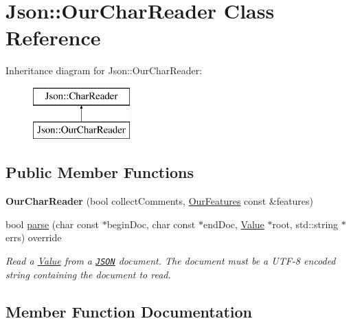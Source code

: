 \hypertarget{class_json_1_1_our_char_reader}{}\section{Json\+:\+:Our\+Char\+Reader Class Reference}
\label{class_json_1_1_our_char_reader}
Inheritance diagram for Json\+:\+:Our\+Char\+Reader\+:\begin{figure}[H]
\begin{center}
\leavevmode
\includegraphics[height=2.000000cm]{class_json_1_1_our_char_reader}
\end{center}
\end{figure}
\subsection*{Public Member Functions}
\begin{DoxyCompactItemize}
\item 
\hypertarget{class_json_1_1_our_char_reader_a5015506620e7ba7bab417756fa1ca9fe}{}{\bfseries Our\+Char\+Reader} (bool collect\+Comments, \hyperlink{class_json_1_1_our_features}{Our\+Features} const \&features)\label{class_json_1_1_our_char_reader_a5015506620e7ba7bab417756fa1ca9fe}

\item 
bool \hyperlink{class_json_1_1_our_char_reader_a52a1fb5fee88d9b63dd462f63b1c9570}{parse} (char const $\ast$begin\+Doc, char const $\ast$end\+Doc, \hyperlink{class_json_1_1_value}{Value} $\ast$root, std\+::string $\ast$errs) override
\begin{DoxyCompactList}\small\item\em Read a \hyperlink{class_json_1_1_value}{Value} from a \href{http://www.json.org}{\tt J\+S\+O\+N} document. The document must be a U\+T\+F-\/8 encoded string containing the document to read. \end{DoxyCompactList}\end{DoxyCompactItemize}


\subsection{Member Function Documentation}
\hypertarget{class_json_1_1_our_char_reader_a52a1fb5fee88d9b63dd462f63b1c9570}{}
